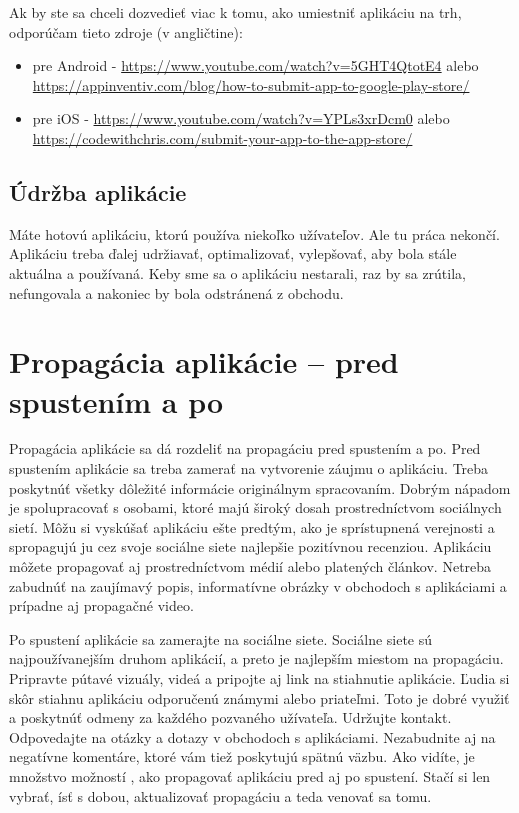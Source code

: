 \documentclass[10pt,twoside,slovak,a4paper]{article}
\begin{document}
\cite{EMM2}

Ak by ste sa chceli dozvedieť viac k tomu, ako umiestniť aplikáciu na trh, odporúčam tieto zdroje (v angličtine):
	\begin{itemize}
	\item pre Android - \url{https://www.youtube.com/watch?v=5GHT4QtotE4} alebo \url{https://appinventiv.com/blog/how-to-submit-app-to-google-play-store/}
	\item pre iOS - \url{https://www.youtube.com/watch?v=YPLs3xrDcm0} alebo \url{https://codewithchris.com/submit-your-app-to-the-app-store/}
	\end{itemize}

\subsection{Údržba aplikácie}
\quad Máte hotovú aplikáciu, ktorú používa niekoľko užívateľov. Ale tu práca nekončí. Aplikáciu treba ďalej udržiavať, optimalizovať, vylepšovať, aby bola stále aktuálna a používaná. Keby sme sa o aplikáciu nestarali, raz by sa zrútila, nefungovala a nakoniec by bola odstránená z obchodu.
\cite{themanifest}



\section{Propagácia aplikácie – pred spustením a po}
\quad Propagácia aplikácie sa dá rozdeliť na propagáciu pred spustením a po. Pred spustením aplikácie sa treba zamerať na vytvorenie záujmu o aplikáciu. Treba poskytnúť všetky dôležité informácie originálnym spracovaním. Dobrým nápadom je spolupracovať s osobami, ktoré majú široký dosah prostredníctvom sociálnych sietí. Môžu si vyskúšať aplikáciu ešte predtým, ako je sprístupnená verejnosti a spropagujú ju cez svoje sociálne siete najlepšie pozitívnou recenziou. Aplikáciu môžete propagovať aj prostredníctvom médií alebo platených článkov. Netreba zabudnúť na zaujímavý popis, informatívne obrázky v obchodoch s aplikáciami a prípadne aj propagačné video.

Po spustení aplikácie sa zamerajte na sociálne siete. Sociálne siete sú najpoužívanejším druhom aplikácií, a preto je najlepším miestom na propagáciu. Pripravte pútavé vizuály, videá a pripojte aj link na stiahnutie aplikácie. Ľudia si skôr stiahnu aplikáciu odporučenú známymi alebo priateľmi. Toto je dobré využiť a poskytnúť odmeny za každého pozvaného užívateľa. Udržujte kontakt. Odpovedajte na otázky a dotazy v obchodoch s aplikáciami. Nezabudnite aj na negatívne komentáre, ktoré vám tiež poskytujú spätnú väzbu. Ako vidíte, je množstvo možností , ako propagovať aplikáciu pred aj po spustení. Stačí si len vybrať, ísť s dobou, aktualizovať propagáciu a teda venovať sa tomu.
\end{document}
